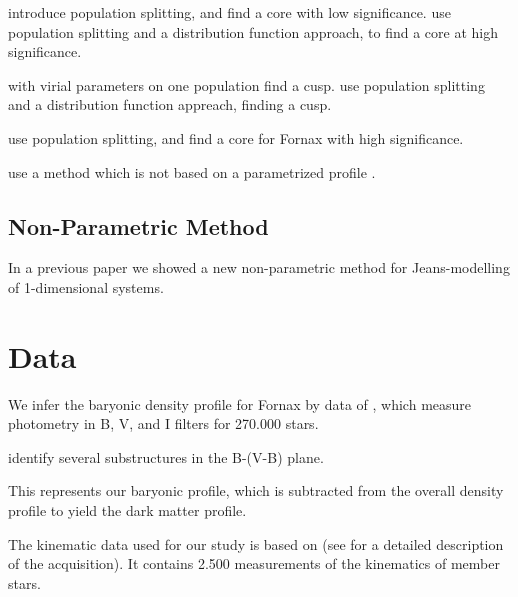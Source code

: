 \citep{Battaglia+2008} introduce population splitting, and find a core
with low significance. \citep{AmoriscoEvans2012} use population
splitting and a distribution function approach, to find a core at high
significance.

\citep{RichardsonFairbairn2014} with virial parameters on one
population find a cusp. \citep{Strigari+2014} use population
splitting and a distribution function appreach, finding a cusp.




\citep{WalkerPenarrubia2011} use population
splitting, and find a core for Fornax with high significance.


\citep{Ibata+2011} use a method which is not based on a parametrized profile .



\subsection{Non-Parametric Method}
In a previous paper \citet{Steger+2014} we showed a new non-parametric
method for Jeans-modelling of 1-dimensional systems.



\section{Data}
We infer the baryonic density profile for Fornax by data of
\cite{deBoer+2012b}, which measure photometry in B, V, and I filters
for 270.000 stars.


\cite{deBoer+2013} identify several substructures in the B-(V-B)
plane.  

This represents our baryonic profile, which is subtracted from the
overall density profile to yield the dark matter profile.


The kinematic data used for our study is based on \citep{Walker2009b}
(see \citep{Walker2009a} for a detailed description of the
acquisition). It contains 2.500 measurements of the kinematics of member stars.






